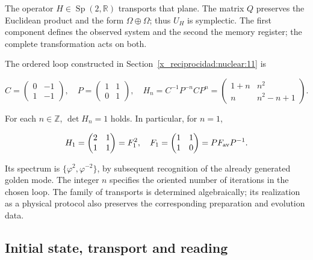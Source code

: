 The operator \(H\in\operatorname{Sp}(2,\mathbb R)\) transports that plane. The matrix \(Q\) preserves the Euclidean product and the form \(\Omega\oplus\Omega\); thus \(U_H\) is symplectic. The first component defines the observed system and the second the memory register; the complete transformation acts on both.

The ordered loop constructed in Section~\ref{x_reciprocidad:nuclear:11} is



\begin{equation}
C=\begin{pmatrix}0&-1\\1&-1\end{pmatrix},\quad
P=\begin{pmatrix}1&1\\0&1\end{pmatrix},\quad
H_n=C^{-1}P^{-n}CP^n
=\begin{pmatrix}1+n&n^2\\n&n^2-n+1\end{pmatrix}.
\label{x_reciprocidad:nuc12:eq:5.2}
\end{equation}



For each \(n\in\mathbb Z\), \(\det H_n=1\) holds. In particular, for \(n=1\),


\begin{equation}
H_1=\begin{pmatrix}2&1\\1&1\end{pmatrix}
=F_1^2,\quad F_1=\begin{pmatrix}1&1\\1&0\end{pmatrix}
=P F_{\rm av}P^{-1}.
\label{x_reciprocidad:nuc12:eq:5.3}
\end{equation}



Its spectrum is \(\{\varphi^2,\varphi^{-2}\}\), by subsequent recognition of the already generated golden mode. The integer \(n\) specifies the oriented number of iterations in the chosen loop. The family of transports is determined algebraically; its realization as a physical protocol also preserves the corresponding preparation and evolution data.

\subsection{Initial state, transport and reading}

